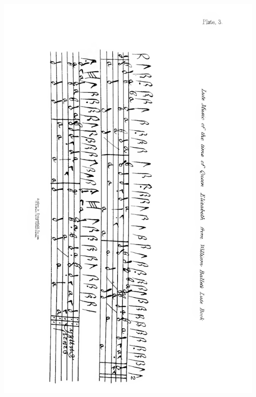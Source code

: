 \thispagestyle{empty}
\noindent\includegraphics*[width=\textwidth]{images/Plate3X.pdf}
\pagebreak
 
